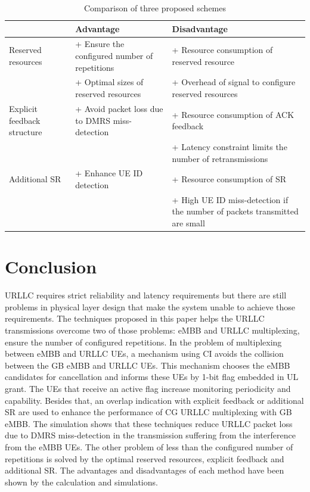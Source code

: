 \documentclass{ieeeaccess}
\begin{document}
\begin{table}[htbp]
\caption{Comparison of three proposed schemes}
\begin{center}
\begin{tabular}{|p{4em}|p{11em}|p{11em}|}
 \hline
& \textbf{Advantage}&\textbf{Disadvantage}\\
 \hline
 Reserved resources &+ Ensure the configured number of repetitions & + Resource consumption of reserved resource\\ & + Optimal sizes of reserved resources &+ Overhead of signal to configure reserved resources\\
 \hline
  Explicit feedback structure& + Avoid packet loss due to DMRS miss-detection&+ Resource consumption of ACK feedback\\& &+ Latency constraint limits the number of retransmissions\\
 \hline
Additional SR&+ Enhance UE ID detection&+ Resource consumption of SR\\& &  + High UE ID miss-detection if the number of packets transmitted are small\\

 
 \hline
\end{tabular}
\label{tab9}
\end{center}

\end{table}

\section{Conclusion}

URLLC requires strict reliability and latency requirements but there are still problems in physical layer design that make the system unable to achieve those requirements. The techniques proposed in this paper helps the URLLC transmissions overcome two of those problems: eMBB and URLLC multiplexing, ensure the number of configured repetitions. In the problem of multiplexing between eMBB and URLLC UEs, a mechanism using CI avoids the collision between the GB eMBB and URLLC UEs. This mechanism chooses the eMBB candidates for cancellation and informs these UEs by 1-bit flag embedded in UL grant. The UEs that receive an active flag increase monitoring periodicity and capability. Besides that, an overlap indication with explicit feedback or additional SR are used to enhance the performance of CG URLLC multiplexing with GB eMBB. The simulation shows that these techniques reduce URLLC packet loss due to DMRS miss-detection in the transmission suffering from the interference from the eMBB UEs. The other problem of less than the configured number of repetitions is solved by the optimal reserved resources, explicit feedback and additional SR. The advantages and disadvantages of each method have been shown by the calculation and simulations. 
\end{document}
